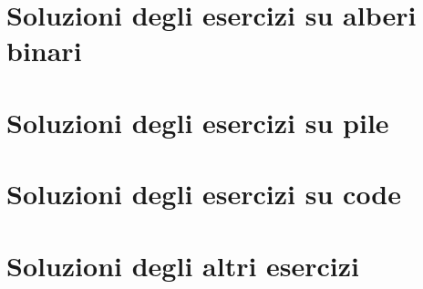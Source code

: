 \documentclass[a4paper,12pt,italian]{report}
\begin{document}
\renewcommand{\thechapter}{SA}
\chapter{Soluzioni degli esercizi su alberi binari}





















\renewcommand{\thechapter}{SP}
\chapter{Soluzioni degli esercizi su pile}



\renewcommand{\thechapter}{SC}
\chapter{Soluzioni degli esercizi su code}





\renewcommand{\thechapter}{SX}
\chapter{Soluzioni degli altri esercizi}













\appendix




\end{document}
